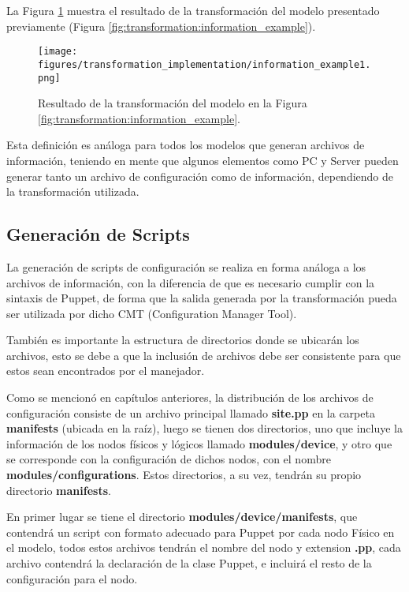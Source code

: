 La Figura \ref{fig:transformation:information_generated} muestra el resultado de la transformación del modelo presentado previamente (Figura \ref{fig:transformation:information_example}).

\begin{figure}[htbp]
    \centering
    \texttt{[image: figures/transformation\_implementation/information\_example1.png]}
    \caption{Resultado de la transformación del modelo en la Figura \ref{fig:transformation:information_example}.}
    \label{fig:transformation:information_generated}
\end{figure}

Esta definición es análoga para todos los modelos que generan archivos de información, teniendo en mente que algunos elementos como PC y Server pueden generar tanto un archivo de configuración como de información, dependiendo de la transformación utilizada.

\subsection{Generación de Scripts}
La generación de scripts de configuración se realiza en forma análoga a los archivos de información, con la diferencia de que es necesario cumplir con la sintaxis de Puppet, de forma que la salida generada por la transformación pueda ser utilizada por dicho CMT (Configuration Manager Tool).

También es importante la estructura de directorios donde se ubicarán los archivos, esto se debe a que la inclusión de archivos debe ser consistente para que estos sean encontrados por el manejador.

Como se mencionó en capítulos anteriores, la distribución de los archivos de configuración consiste de un archivo principal llamado \textbf{site.pp} en la carpeta \textbf{manifests} (ubicada en la raíz), luego se tienen dos directorios, uno que incluye la información de los nodos físicos y lógicos llamado \textbf{modules/device}, y otro que se corresponde con la configuración de dichos nodos, con el nombre \textbf{modules/configurations}. Estos directorios, a su vez, tendrán su propio directorio \textbf{manifests}.

En primer lugar se tiene el directorio \textbf{modules/device/manifests}, que contendrá un script con formato adecuado para Puppet por cada nodo Físico en el modelo, todos estos archivos tendrán el nombre del nodo y extension \textbf{.pp}, cada archivo contendrá la declaración de la clase Puppet, e incluirá el resto de la configuración para el nodo. 

